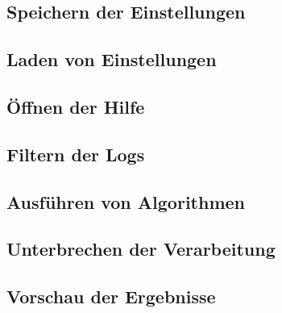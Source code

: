 \subsection{Speichern der Einstellungen}
\label{usecase:4}
\subsection{Laden von Einstellungen}
\label{usecase:5}
\subsection{Öffnen der Hilfe}
\label{usecase:6}
\subsection{Filtern der Logs}
\label{usecase:7}
\subsection{Ausführen von Algorithmen}
\label{usecase:8}
\subsection{Unterbrechen der Verarbeitung}
\label{usecase:9}
\subsection{Vorschau der Ergebnisse}
\label{usecase:10}


\iffalse
